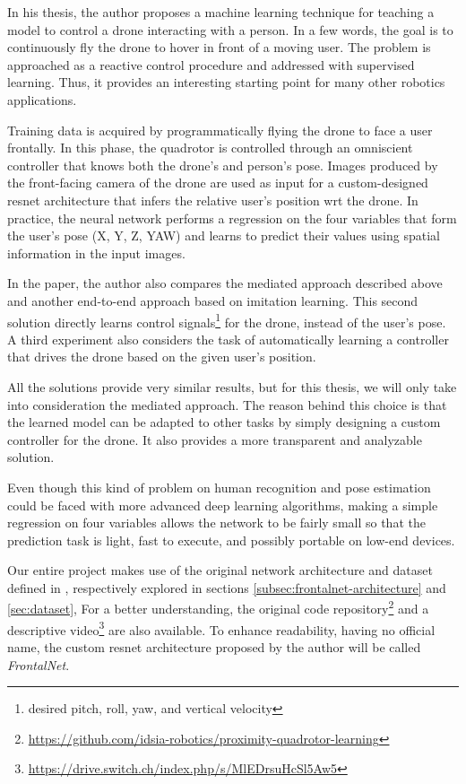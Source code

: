 \medskip

In his thesis, the author proposes a machine learning technique for teaching a model to control a drone interacting with a person. In a few words, the goal is to continuously fly the drone to hover in front of a moving user. The problem is approached as a reactive control procedure and addressed with supervised learning. Thus, it provides an interesting starting point for many other robotics applications.

Training data is acquired by programmatically flying the drone to face a user frontally. In this phase, the quadrotor is controlled through an omniscient controller that knows both the drone's and person's pose. Images produced by the front-facing camera of the drone are used as input for a custom-designed \gls{resnet} architecture that infers the relative user's position \gls{wrt} the drone. In practice, the neural network performs a regression on the four variables that form the user's pose (X, Y, Z, YAW) and learns to predict their values using spatial information in the input images.

In the paper, the author also compares the mediated approach described above and another end-to-end approach based on imitation learning. This second solution directly learns control signals\footnote{desired pitch, roll, yaw, and vertical velocity} for the drone, instead of the user's pose. A third experiment also considers the task of automatically learning a controller that drives the drone based on the given user's position.

All the solutions provide very similar results, but for this thesis, we will only take into consideration the mediated approach. The reason behind this choice is that the learned model can be adapted to other tasks by simply designing a custom controller for the drone. It also provides a more transparent and analyzable solution.

\medskip

Even though this kind of problem on human recognition and pose estimation could be faced with more advanced deep learning algorithms, making a simple regression on four variables allows the network to be fairly small so that the prediction task is light, fast to execute, and possibly portable on low-end devices.

Our entire project makes use of the original network architecture and dataset defined in \cite{mantegazza2019visionbased}, respectively explored in sections \ref{subsec:frontalnet-architecture} and \ref{sec:dataset}, For a better understanding, the original code repository\footnote{\url{https://github.com/idsia-robotics/proximity-quadrotor-learning}} and a descriptive video\footnote{\url{https://drive.switch.ch/index.php/s/MlEDrsuHcSl5Aw5}} are also available. 
To enhance readability, having no official name, the custom \gls{resnet} architecture proposed by the author will be called \textit{FrontalNet}.


